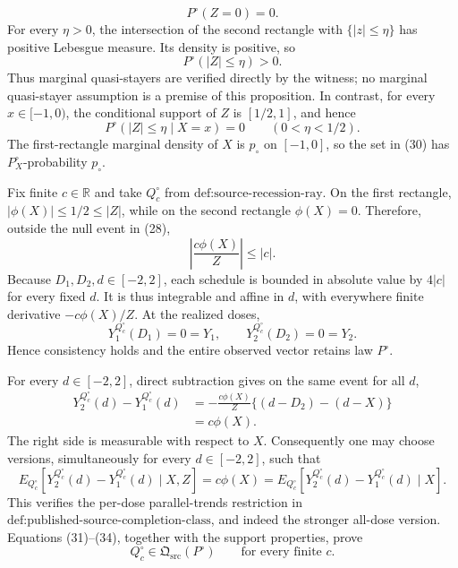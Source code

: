 \[
P^{\circ}(Z=0)=0. \tag{28}
\]
For every \(\eta>0\), the intersection of the second rectangle with \(\{|z|\leq\eta\}\) has positive Lebesgue measure. Its density is positive, so
\[
P^{\circ}(|Z|\leq\eta)>0. \tag{29}
\]
Thus marginal quasi-stayers are verified directly by the witness; no marginal quasi-stayer assumption is a premise of this proposition. In contrast, for every \(x\in[-1,0)\), the conditional support of \(Z\) is \([1/2,1]\), and hence
\[
P^{\circ}(|Z|\leq\eta\mid X=x)=0
\qquad(0<\eta<1/2). \tag{30}
\]
The first-rectangle marginal density of \(X\) is \(p_{\circ}\) on \([-1,0]\), so the set in (30) has \(P_X^{\circ}\)-probability \(p_{\circ}\).

Fix finite \(c\in\mathbb R\) and take \(Q_c^{\circ}\) from \(\text{def:source-recession-ray}\). On the first rectangle, \(|\phi(X)|\leq1/2\leq|Z|\), while on the second rectangle \(\phi(X)=0\). Therefore, outside the null event in (28),
\[
\left|\frac{c\phi(X)}{Z}\right|\leq |c|. \tag{31}
\]
Because \(D_1,D_2,d\in[-2,2]\), each schedule is bounded in absolute value by \(4|c|\) for every fixed \(d\). It is thus integrable and affine in \(d\), with everywhere finite derivative \(-c\phi(X)/Z\). At the realized doses,
\[
Y_1^{Q_c^{\circ}}(D_1)=0=Y_1,
\qquad
Y_2^{Q_c^{\circ}}(D_2)=0=Y_2. \tag{32}
\]
Hence consistency holds and the entire observed vector retains law \(P^{\circ}\).

For every \(d\in[-2,2]\), direct subtraction gives on the same event for all \(d\),
\[
\begin{aligned}
Y_2^{Q_c^{\circ}}(d)-Y_1^{Q_c^{\circ}}(d)
&=-\frac{c\phi(X)}{Z}\{(d-D_2)-(d-X)\}\\
&=c\phi(X).
\end{aligned} \tag{33}
\]
The right side is measurable with respect to \(X\). Consequently one may choose versions, simultaneously for every \(d\in[-2,2]\), such that
\[
E_{Q_c^{\circ}}[Y_2^{Q_c^{\circ}}(d)-Y_1^{Q_c^{\circ}}(d)\mid X,Z]
=c\phi(X)
=E_{Q_c^{\circ}}[Y_2^{Q_c^{\circ}}(d)-Y_1^{Q_c^{\circ}}(d)\mid X]. \tag{34}
\]
This verifies the per-dose parallel-trends restriction in \(\text{def:published-source-completion-class}\), and indeed the stronger all-dose version. Equations (31)--(34), together with the support properties, prove
\[
Q_c^{\circ}\in\mathfrak Q_{\mathrm{src}}(P^{\circ})
\qquad\text{for every finite }c. \tag{35}
\]

